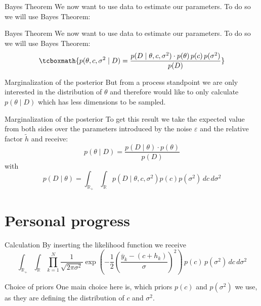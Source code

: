 \documentclass{beamer}
\newcommand{\s}{\sigma^2}
\begin{document}
  	\begin{frame}{Bayes Theorem}
  		We now want to use data to estimate our parameters. To 
  		do so we will use Bayes Theorem: %
  	\end{frame}

	\begin{frame}{Bayes Theorem}
  		We now want to use data to estimate our parameters. To 
  		do so we will use Bayes Theorem:
  		\[  \tcboxmath{p(\theta,c,\s \mid D) = \frac{p(D \mid \theta,c,\s) \cdot
  		p(\theta) \, p(c) \, p(\s)}{p(D)}} \]
  	\end{frame}
  	
	\begin{frame}{Marginalization of the posterior}
  		But from a process standpoint we are only 
  		interested in the distribution of $\theta$ and therefore would like to 
  		only calculate $p(\theta \mid D)$ which has less dimensions to be sampled.
  	\end{frame}
  	
  	\begin{frame}{Marginalization of the posterior}
		To get this result we take the expected value from both sides over the 
		parameters introduced by the noise $\varepsilon$ and the relative factor 
		$\tilde{h}$ and receive:
		\[
			p(\theta \mid D) = \frac{p(D \mid \theta) \cdot p(\theta)}{p(D)}
		\]
		with 
		\[
			p(D \mid \theta) = \int_{\mathbb{R}_+} \int_{\mathbb{R}} p(D \mid 
			\theta,c,\s) p(c) p(\s) \, dc \, d\s
		\]
  	\end{frame}  
  
\section{Personal progress}
	
	\begin{frame}{Calculation}
		By inserting the likelihood function we receive
		\[
			\int_{\mathbb{R}_+} \int_\mathbb{R} \prod_{k = 1}^N \frac{1}{\sqrt{2 
			\pi \s}} \exp\left(-\frac{1}{2} \left(\frac{\overline{y}_{k} -\left( c 
			+ h_{k} \right)}{\sigma} \right)^2\right) \, p(c) \, p(\s) \, dc 
			\, d\s
		\]
	\end{frame}


	\begin{frame}{Choice of priors}
		One main choice here is, which priors $p(c)$ and $p(\s)$ we use, as they 
		are defining the distribution of $c$ and $\s$.
	\end{frame}
\end{document}
